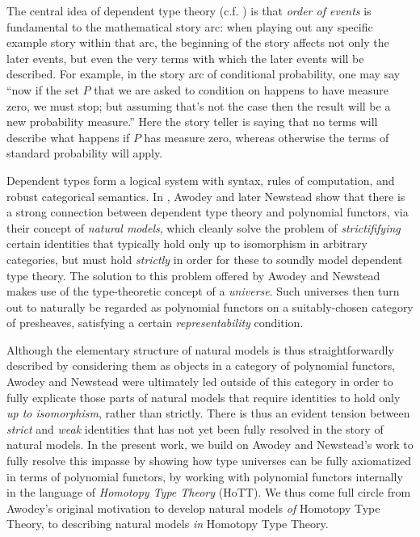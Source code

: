 \documentclass[
  11pt,
  oneside,
  article]{memoir}
\theoremstyle{definition}
\theoremstyle{plain}
\newcommand{\0}{\textsf{0}}
\newcommand{\1}{\tn{\textsf{1}}}
\begin{document}
The central idea of dependent type theory (c.f.
\cite{martin-lof1975intuitionistic}) is that \emph{order of events} is
fundamental to the mathematical story arc: when playing out any specific
example story within that arc, the beginning of the story affects not
only the later events, but even the very terms with which the later
events will be described. For example, in the story arc of conditional
probability, one may say ``now if the set \(P\) that we are asked to
condition on happens to have measure zero, we must stop; but assuming
that's not the case then the result will be a new probability
measure.'' Here the story teller is saying that no terms will describe
what happens if \(P\) has measure zero, whereas otherwise the terms of
standard probability will apply.

Dependent types form a logical system with syntax, rules of computation,
and robust categorical semantics. In
\cite{awodey2014natural,awodey2018polynomial}, Awodey and later Newstead
show that there is a strong connection between dependent type theory and
polynomial functors, via their concept of \emph{natural models}, which
cleanly solve the problem of \emph{strictififying} certain identities
that typically hold only up to isomorphism in arbitrary categories, but
must hold \emph{strictly} in order for these to soundly model dependent
type theory. The solution to this problem offered by Awodey and Newstead
makes use of the type-theoretic concept of a \emph{universe}. Such
universes then turn out to naturally be regarded as polynomial functors
on a suitably-chosen category of presheaves, satisfying a certain
\emph{representability} condition.

Although the elementary structure of natural models is thus
straightforwardly described by considering them as objects in a category
of polynomial functors, Awodey and Newstead were ultimately led outside
of this category in order to fully explicate those parts of natural
models that require identities to hold only \emph{up to isomorphism},
rather than strictly. There is thus an evident tension between
\emph{strict} and \emph{weak} identities that has not yet been fully
resolved in the story of natural models. In the present work, we build
on Awodey and Newstead's work to fully resolve this impasse by showing
how type universes can be fully axiomatized in terms of polynomial
functors, by working with polynomial functors internally in the language
of \emph{Homotopy Type Theory} (HoTT). We thus come full circle from
Awodey's original motivation to develop natural models \emph{of}
Homotopy Type Theory, to describing natural models \emph{in} Homotopy
Type Theory.
\end{document}
